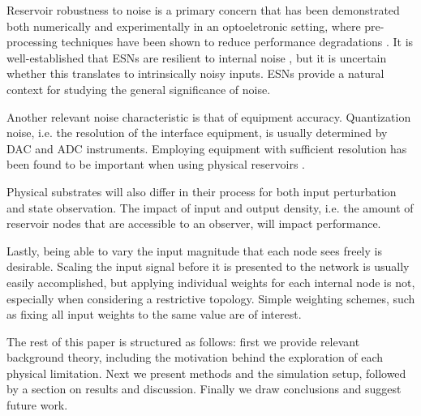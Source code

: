 Reservoir robustness to noise is a primary concern that has been demonstrated
both numerically and experimentally in an optoeletronic setting, where
pre-processing techniques have been shown to reduce performance degradations
\cite{soriano_optoelectronic_2013}. It is well-established that ESNs are
resilient to internal noise \cite{jaeger_echo_2001}, but it is uncertain whether
this translates to intrinsically noisy inputs. ESNs provide a natural context
for studying the general significance of noise.

Another relevant noise characteristic is that of equipment
accuracy. Quantization noise, i.e. the resolution of the interface equipment, is
usually determined by DAC and ADC instruments. Employing equipment with
sufficient resolution has been found to be important when using physical
reservoirs \cite{soriano_delay-based_2015}.

Physical substrates will also differ in their process for both input
perturbation and state observation. The impact of input and output density,
i.e. the amount of reservoir nodes that are accessible to an observer, will
impact performance.

Lastly, being able to vary the input magnitude that each node sees freely is
desirable. Scaling the input signal before it is presented to the network is
usually easily accomplished, but applying individual weights for each internal
node is not, especially when considering a restrictive topology. Simple
weighting schemes, such as fixing all input weights to the same value are of
interest.

The rest of this paper is structured as follows: first we provide relevant
background theory, including the motivation behind the exploration of each
physical limitation. Next we present methods and the simulation setup, followed
by a section on results and discussion. Finally we draw conclusions and suggest
future work.

